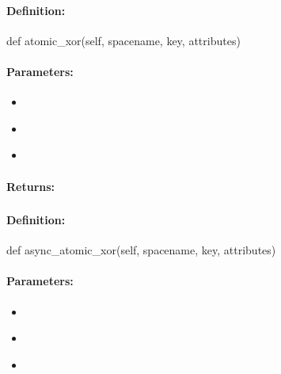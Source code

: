\paragraph{Definition:}
\begin{pythoncode}
def atomic_xor(self, spacename, key, attributes)
\end{pythoncode}

\paragraph{Parameters:}
\begin{itemize}[noitemsep]
\item {}\\

\item {}\\

\item {}\\

\end{itemize}

\paragraph{Returns:}


\pagebreak
\subsubsection{}
\label{api:python:async_atomic_xor}


\paragraph{Definition:}
\begin{pythoncode}
def async_atomic_xor(self, spacename, key, attributes)
\end{pythoncode}

\paragraph{Parameters:}
\begin{itemize}[noitemsep]
\item {}\\

\item {}\\

\item {}\\

\end{itemize}

